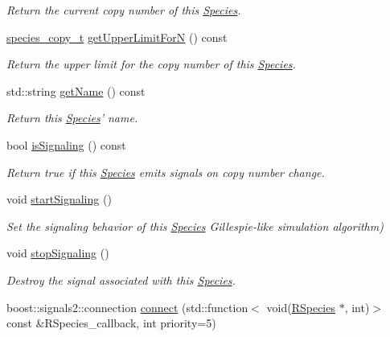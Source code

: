 \begin{DoxyCompactItemize}
\begin{DoxyCompactList}\small\item\em Return the current copy number of this \hyperlink{classchem_1_1Species}{Species}. \end{DoxyCompactList}\item 
\hyperlink{common_8h_a3503f321fd36304ee274141275cca586}{species\-\_\-copy\-\_\-t} \hyperlink{classchem_1_1Species_a05fbe0a05f028beb1bb729f19d44a56a}{get\-Upper\-Limit\-For\-N} () const 
\begin{DoxyCompactList}\small\item\em Return the upper limit for the copy number of this \hyperlink{classchem_1_1Species}{Species}. \end{DoxyCompactList}\item 
std\-::string \hyperlink{classchem_1_1Species_aa32c8f7fb344c68539a927c6a7f916c7}{get\-Name} () const 
\begin{DoxyCompactList}\small\item\em Return this \hyperlink{classchem_1_1Species}{Species}' name. \end{DoxyCompactList}\item 
bool \hyperlink{classchem_1_1Species_aa412f592e88600b48e3df591fc4cd655}{is\-Signaling} () const 
\begin{DoxyCompactList}\small\item\em Return true if this \hyperlink{classchem_1_1Species}{Species} emits signals on copy number change. \end{DoxyCompactList}\item 
void \hyperlink{classchem_1_1Species_a2d3d9f6e7c7d9c7bdd87ff5373a7d08c}{start\-Signaling} ()
\begin{DoxyCompactList}\small\item\em Set the signaling behavior of this \hyperlink{classchem_1_1Species}{Species} Gillespie-\/like simulation algorithm) \end{DoxyCompactList}\item 
void \hyperlink{classchem_1_1Species_a9d34195d05f3e35e00dd20892ff7393b}{stop\-Signaling} ()
\begin{DoxyCompactList}\small\item\em Destroy the signal associated with this \hyperlink{classchem_1_1Species}{Species}. \end{DoxyCompactList}\item 
boost\-::signals2\-::connection \hyperlink{classchem_1_1Species_a9a582e18e231a65761cb10c14d0a0a68}{connect} (std\-::function$<$ void(\hyperlink{classchem_1_1RSpecies}{R\-Species} $\ast$, int)$>$ const \&R\-Species\-\_\-callback, int priority=5)

\end{DoxyCompactItemize}
